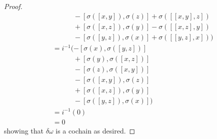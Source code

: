 \begin{proof}
\begin{align*}
                          &\quad\quad\quad - [\sigma([x, y]), \sigma(z)]+\sigma([[x,y], z]) \\
                          &\quad\quad\quad + [\sigma([x, z]), \sigma(y)] -\sigma([[x,z], y]) \\
                          &\quad\quad\quad - [\sigma([y, z]), \sigma(x)] +\sigma([[y,z], x])) \\
                          &= i^{-1}(- [\sigma(x), \sigma([y, z])] \\
                          &\quad\quad\quad + [\sigma(y), \sigma([x, z])] \\
                          &\quad\quad\quad - [\sigma(z), \sigma([x, y])] \\
                          &\quad\quad\quad - [\sigma([x, y]), \sigma(z)] \\
                          &\quad\quad\quad + [\sigma([x, z]), \sigma(y)] \\
                          &\quad\quad\quad - [\sigma([y, z]), \sigma(x)]) \\
                          &= i^{-1}(0) \\
                          &= 0
  \end{align*}
  showing that $ \delta\omega $ is a cochain as desired.
\end{proof}

